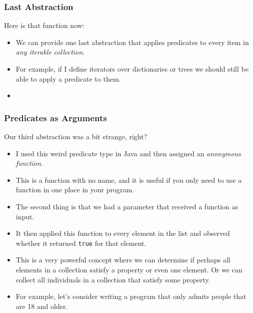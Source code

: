 \documentclass{beamer}
\begin{document}

\begin{frame}
  \frametitle{Last Abstraction}
  Here is that function now:
  \abstractThree
  \begin{itemize}
  \item<2-> We can provide one last abstraction that applies predicates to every item in \emph{any iterable collection}.
  \item<3-> For example, if I define iterators over dictionaries or trees we should still be able to
    apply a predicate to them.
  \item<4-> \abstractFour
  \end{itemize}
\end{frame}

\begin{frame}
  \frametitle{Predicates as Arguments}
  Our third abstraction was a bit strange, right?
  \begin{itemize}
  \item<2-> I used this weird predicate type in Java and then assigned an \emph{anonymous function}.
  \item<3-> This is a function with no name, and it is useful if you only need to use a function
    in one place in your program.
  \item<4-> The second thing is that we had a parameter that received a function as input.
  \item<5-> It then applied this function to every element in the list and observed whether it
    returned \texttt{true} for that element.
  \item<6-> This is a very powerful concept where we can determine if perhaps all elements in a collection
    satisfy a property or even one element. Or we can collect all individuals in a collection that satisfy
    some property.
  \item<7-> For example, let's consider writing a program that only admits people that are 18 and older. 
  \end{itemize}
\end{frame}

\end{document}
